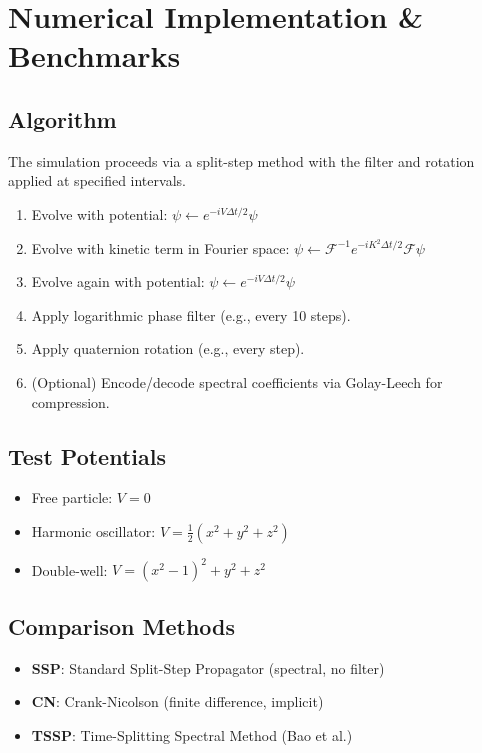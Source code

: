 \documentclass[12pt]{article}
\begin{document}
\section{Numerical Implementation & Benchmarks}
\subsection{Algorithm}
The simulation proceeds via a split-step method with the filter and rotation applied at specified intervals.
\begin{enumerate}
    \item Evolve with potential: $ \psi \leftarrow e^{-iV\Delta t/2} \psi $
    \item Evolve with kinetic term in Fourier space: $ \psi \leftarrow \mathcal{F}^{-1} e^{-iK^2\Delta t/2} \mathcal{F} \psi $
    \item Evolve again with potential: $ \psi \leftarrow e^{-iV\Delta t/2} \psi $
    \item Apply logarithmic phase filter (e.g., every 10 steps).
    \item Apply quaternion rotation (e.g., every step).
    \item (Optional) Encode/decode spectral coefficients via Golay-Leech for compression.
\end{enumerate}

\subsection{Test Potentials}
\begin{itemize}
    \item Free particle: $ V=0 $
    \item Harmonic oscillator: $ V = \frac{1}{2}(x^2+y^2+z^2) $
    \item Double-well: $ V = (x^2-1)^2+y^2+z^2 $
\end{itemize}

\subsection{Comparison Methods}
\begin{itemize}
    \item \textbf{SSP}: Standard Split-Step Propagator (spectral, no filter)
    \item \textbf{CN}: Crank-Nicolson (finite difference, implicit)
    \item \textbf{TSSP}: Time-Splitting Spectral Method (Bao et al.)
\end{itemize}
\end{document}
